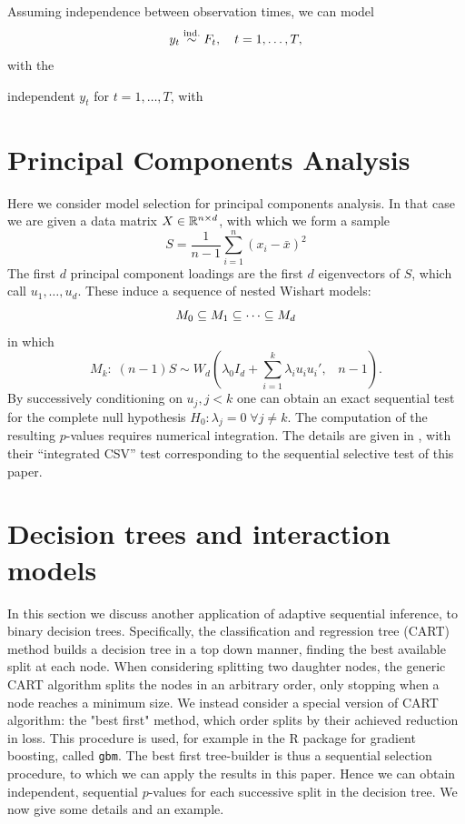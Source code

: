 \documentclass{article}
\begin{document}
Assuming independence between observation times, we can model
\[
y_t \overset{\textrm{ind.}}{\sim} F_t, \quad t=1,\ldots, T,
\]
with the 


 independent $y_t$ for $t=1,\ldots,T$, with



\section{Principal Components Analysis}
\label{sec:pca}


Here we consider model selection for principal components analysis. In that case we are given a data matrix $X \in \mathbb{R}^{n\times d}$, with which we form a sample %
\[
S = \frac{1}{n-1} \sum_{i=1}^n(x_i - \bar x)^2
\]
The first $d$ principal component loadings are the first $d$ eigenvectors of $S$, which call $u_1,\ldots, u_d$. These induce a sequence of nested Wishart models:
\[
M_0 \subseteq M_1 \subseteq \cdots \subseteq M_d
\]
in which
\begin{equation}
  M_k:\; (n-1) S \sim W_d\left(\lambda_0 I_d + \sum_{i=1}^k     \lambda_i u_i u_i', \;\;\; n-1\right).
\end{equation}
 By successively conditioning on $u_j, j<k$ one can obtain an exact sequential test
for the complete null hypothesis $H_0: \lambda_j=0 \; \forall j \neq k$.  The computation of the resulting $p$-values requires numerical integration.
The details are given in \citet{choi2014selecting}, with their ``integrated CSV'' test  corresponding to the sequential selective test of this paper.


\section{Decision trees and interaction models}
In this section we discuss another application of adaptive sequential inference, to binary decision trees.
Specifically, the classification and regression tree  (CART)  method builds a decision tree in a top down manner, finding the best available split
at each node.  When considering splitting two daughter nodes, the generic CART algorithm splits the nodes in an arbitrary order, only stopping when a node
reaches a minimum size.  We instead consider a  special version of CART  algorithm:  the   "best first"  method, which order splits by their achieved reduction in loss.
This procedure is used, for example in the R package for gradient boosting, called {\tt gbm}.
The best first tree-builder is thus a sequential selection  procedure,  to which we can apply the results in this paper. Hence we can obtain independent, sequential $p$-values
for each successive split in the decision  tree. We now give some details and an example.
\end{document}
